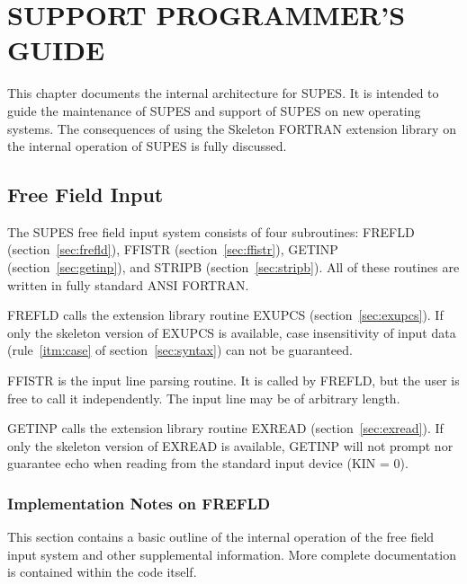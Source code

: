 \chapter{SUPPORT PROGRAMMER'S GUIDE} \label{sec:support}
This chapter documents the internal architecture for SUPES.  It is intended
to guide the maintenance of SUPES and support of SUPES on new operating
systems.  The consequences of using the Skeleton FORTRAN extension library
on the internal operation of SUPES is fully discussed.


\section{Free Field Input} The SUPES free field input system consists of
four subroutines: FREFLD (section~\ref{sec:frefld}),
FFISTR (section~\ref{sec:ffistr}), GETINP
(section~\ref{sec:getinp}), and STRIPB (section~\ref{sec:stripb}). All of
these routines are written in fully standard ANSI FORTRAN. 

FREFLD calls the extension library routine EXUPCS
(section~\ref{sec:exupcs}). If only the skeleton version of EXUPCS is
available, case insensitivity of input data (rule~\ref{itm:case} of
section~\ref{sec:syntax}) can not be guaranteed. 

FFISTR is the input line parsing routine.
It is called by FREFLD,
but the user is free to call it independently.
The input line may be of arbitrary length.

GETINP calls the extension library routine EXREAD
(section~\ref{sec:exread}). If only the skeleton version of EXREAD is
available, GETINP will not prompt nor guarantee echo when reading from the
standard input device (KIN = 0). 


\subsection{Implementation Notes on FREFLD}

This section contains a basic outline of the internal operation of the free
field input system and other supplemental information.  More complete
documentation is contained within the code itself.

